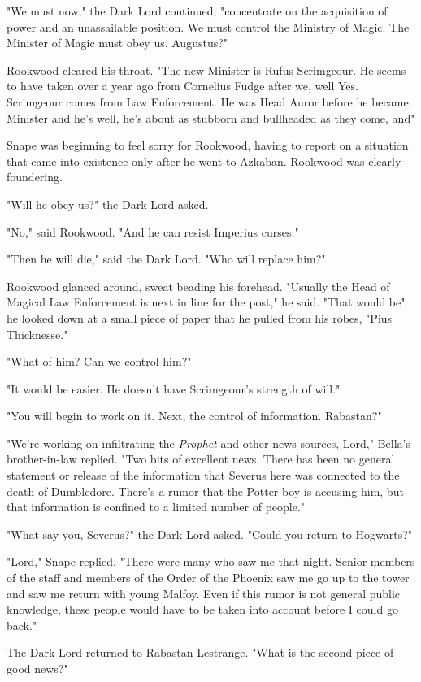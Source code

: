 "We must now," the Dark Lord continued, "concentrate on the acquisition of power and an unassailable position. We must control the Ministry of Magic. The Minister of Magic must obey us. Augustus?"

Rookwood cleared his throat. "The new Minister is Rufus Scrimgeour. He seems to have taken over a year ago from Cornelius Fudge after we, well{\el} Yes. Scrimgeour comes from Law Enforcement. He was Head Auror before he became Minister and he's{\el} well, he's about as stubborn and bullheaded as they come, and{\el}"

Snape was beginning to feel sorry for Rookwood, having to report on a situation that came into existence only after he went to Azkaban. Rookwood was clearly foundering.

"Will he obey us?" the Dark Lord asked.

"No," said Rookwood. "And he can resist Imperius curses."

"Then he will die," said the Dark Lord. "Who will replace him?"

Rookwood glanced around, sweat beading his forehead. "Usually the Head of Magical Law Enforcement is next in line for the post," he said. "That would be{\el}" he looked down at a small piece of paper that he pulled from his robes, "Pius Thicknesse."

"What of him? Can we control him?"

"It would be easier. He doesn't have Scrimgeour's strength of will."

"You will begin to work on it. Next, the control of information. Rabastan?"

"We're working on infiltrating the \emph{Prophet} and other news sources, Lord," Bella's brother-in-law replied. "Two bits of excellent news. There has been no general statement or release of the information that Severus here was connected to the death of Dumbledore. There's a rumor that the Potter boy is accusing him, but that information is confined to a limited number of people."

"What say you, Severus?" the Dark Lord asked. "Could you return to Hogwarts?"

"Lord," Snape replied. "There were many who saw me that night. Senior members of the staff and members of the Order of the Phoenix saw me go up to the tower and saw me return with young Malfoy. Even if this rumor is not general public knowledge, these people would have to be taken into account before I could go back."

The Dark Lord returned to Rabastan Lestrange. "What is the second piece of good news?"

